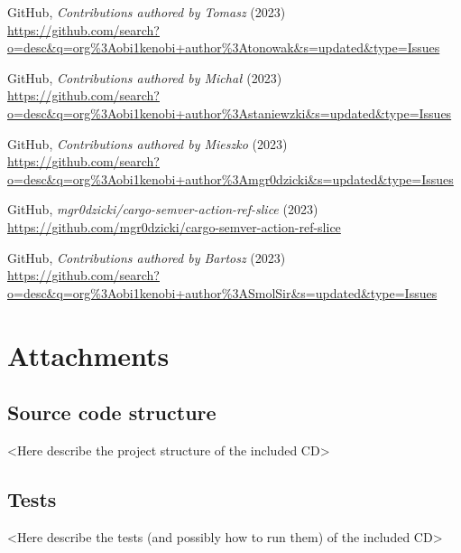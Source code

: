 \documentclass[licencjacka,en]{pracamgr}
\begin{document}
\begin{thebibliography}{99}






 GitHub,
	\textit{Contributions authored by Tomasz} (2023) \\
	\url{https://github.com/search?o=desc&q=org%3Aobi1kenobi+author%3Atonowak&s=updated&type=Issues}

 GitHub,
	\textit{Contributions authored by Michał} (2023) \\
	\url{https://github.com/search?o=desc&q=org%3Aobi1kenobi+author%3Astaniewzki&s=updated&type=Issues}

 GitHub,
	\textit{Contributions authored by Mieszko} (2023) \\
	\url{https://github.com/search?o=desc&q=org%3Aobi1kenobi+author%3Amgr0dzicki&s=updated&type=Issues}

 GitHub,
	\textit{mgr0dzicki/cargo-semver-action-ref-slice} (2023) \\
	\url{https://github.com/mgr0dzicki/cargo-semver-action-ref-slice}

 GitHub,
	\textit{Contributions authored by Bartosz} (2023) \\
	\url{https://github.com/search?o=desc&q=org%3Aobi1kenobi+author%3ASmolSir&s=updated&type=Issues}

\end{thebibliography}



\chapter*{Attachments}

\section*{Source code structure}

<Here describe the project structure of the included CD>


\section*{Tests}

<Here describe the tests (and possibly how to run them) of the included CD>
\end{document}
